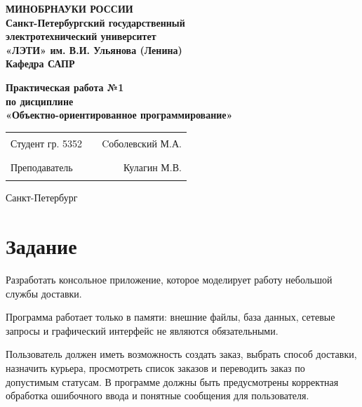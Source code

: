 \documentclass[12pt]{extarticle}
\begin{document}
\begin{center}
  \textbf{МИНОБРНАУКИ РОССИИ} \\
  \textbf{Санкт-Петербургский государственный} \\
  \textbf{электротехнический университет} \\
  \textbf{«ЛЭТИ» им. В.И. Ульянова (Ленина)} \\
  \textbf{Кафедра САПР} \\
\end{center}

\vspace{0.25\textheight}

\begin{center}
\textbf{Практическая работа №1} \\
\textbf{по дисциплине} \\
\textbf{«Объектно-ориентированное программирование»} \\
\end{center}

\vspace*{\fill}

\begin{center}
\begin{tabularx}{\textwidth}{ l X r }
 Студент гр. 5352 & \rule{8cm}{0.2mm} & Cоболевский М.А. \\
 Преподаватель & \rule{8cm}{0.2mm} & Кулагин М.В. \\
\end{tabularx}
\end{center}

\vspace{3em}

\begin{center}
Санкт-Петербург\\
\the\year
\end{center}

\thispagestyle{empty}

\pagebreak

\section{Задание}

Разработать консольное приложение, которое моделирует работу небольшой службы доставки.

Программа работает только в памяти: внешние файлы, база данных, сетевые запросы и графический интерфейс не являются обязательными.

Пользователь должен иметь возможность создать заказ, выбрать способ доставки, назначить курьера, просмотреть список заказов и переводить заказ по допустимым статусам. В программе должны быть предусмотрены корректная обработка ошибочного ввода и понятные сообщения для пользователя.
\end{document}

